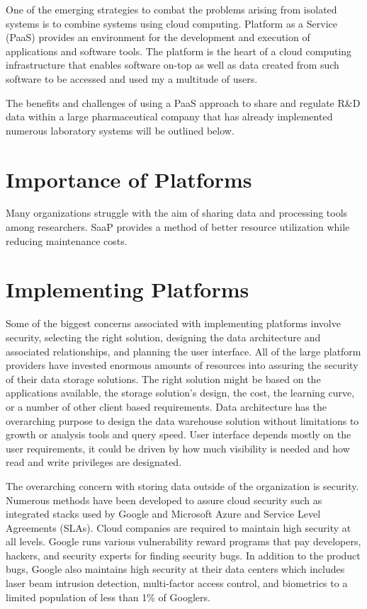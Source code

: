 \documentclass[sigconf]{acmart}
\begin{document}
One of the emerging strategies to combat the problems arising from isolated systems is to combine systems using cloud computing. Platform as a Service (PaaS) provides an environment for the development and execution of applications and software tools. The platform is the heart of a cloud computing infrastructure that enables software on-top as well as data created from such software to be accessed and used my a multitude of users\cite{Ojala}.

The benefits and challenges of using a PaaS approach to share and regulate R\&D data within a large pharmaceutical company that has already implemented numerous laboratory systems will be outlined below. 

\section{Importance of Platforms}	
Many organizations struggle with the aim of sharing data and processing tools among researchers. SaaP provides a method of better resource utilization while reducing maintenance costs\cite{Oh}. 



\section{Implementing Platforms}
Some of the biggest concerns associated with implementing platforms involve security, selecting the right solution, designing the data architecture and associated relationships, and planning the user interface. All of the large platform providers have invested enormous amounts of resources into assuring the security of their data storage solutions. The right solution might be based on the applications available, the storage solution's design, the cost, the learning curve, or a number of other client based requirements. Data architecture has the overarching purpose to design the data warehouse solution without limitations to growth or analysis tools and query speed. User interface depends mostly on the user requirements, it could be driven by how much visibility is needed and how read and write privileges are designated. 

The overarching concern with storing data outside of the organization is security. Numerous methods have been developed to assure cloud security such as integrated stacks used by Google and Microsoft Azure and Service Level Agreements (SLAs)\cite{Casola}. Cloud companies are required to maintain high security at all levels. Google runs various vulnerability reward programs that pay developers, hackers, and security experts for finding security bugs. In addition to the product bugs, Google also maintains high security at their data centers which includes laser beam intrusion detection, multi-factor access control, and biometrics to a limited population of less than 1\% of Googlers\cite{www-gcp_security}. 
\end{document}
